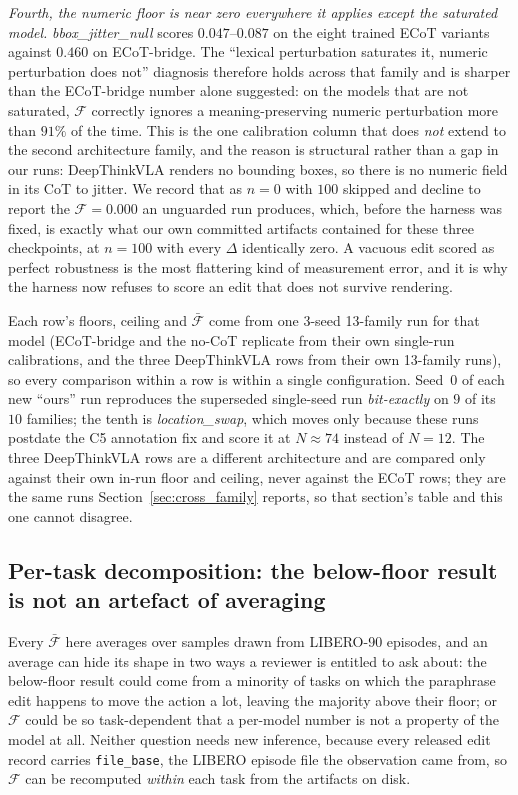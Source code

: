 \documentclass{article}
\begin{document}
\emph{Fourth, the numeric floor is near zero everywhere it applies except the saturated model.} \emph{bbox\_jitter\_null} scores $0.047$--$0.087$ on the eight trained ECoT variants against $0.460$ on ECoT-bridge. The ``lexical perturbation saturates it, numeric perturbation does not'' diagnosis therefore holds across that family and is sharper than the ECoT-bridge number alone suggested: on the models that are not saturated, $\mathcal{F}$ correctly ignores a meaning-preserving numeric perturbation more than $91\%$ of the time. This is the one calibration column that does \emph{not} extend to the second architecture family, and the reason is structural rather than a gap in our runs: DeepThinkVLA renders no bounding boxes, so there is no numeric field in its CoT to jitter. We record that as $n{=}0$ with $100$ skipped and decline to report the $\mathcal{F}=0.000$ an unguarded run produces, which, before the harness was fixed, is exactly what our own committed artifacts contained for these three checkpoints, at $n{=}100$ with every $\Delta$ identically zero. A vacuous edit scored as perfect robustness is the most flattering kind of measurement error, and it is why the harness now refuses to score an edit that does not survive rendering.

Each row's floors, ceiling and $\bar{\mathcal{F}}$ come from one 3-seed 13-family run for that model (ECoT-bridge and the no-CoT replicate from their own single-run calibrations, and the three DeepThinkVLA rows from their own 13-family runs), so every comparison within a row is within a single configuration. Seed~0 of each new ``ours'' run reproduces the superseded single-seed run \emph{bit-exactly} on $9$ of its $10$ families; the tenth is \emph{location\_swap}, which moves only because these runs postdate the C5 annotation fix and score it at $N\!\approx\!74$ instead of $N{=}12$. The three DeepThinkVLA rows are a different architecture and are compared only against their own in-run floor and ceiling, never against the ECoT rows; they are the same runs Section~\ref{sec:cross_family} reports, so that section's table and this one cannot disagree.

\subsection{Per-task decomposition: the below-floor result is not an artefact of averaging}
\label{sec:per_task}

Every $\bar{\mathcal{F}}$ here averages over samples drawn from LIBERO-90 episodes, and an average can hide its shape in two ways a reviewer is entitled to ask about: the below-floor result could come from a minority of tasks on which the paraphrase edit happens to move the action a lot, leaving the majority above their floor; or $\mathcal{F}$ could be so task-dependent that a per-model number is not a property of the model at all. Neither question needs new inference, because every released edit record carries \texttt{file\_base}, the LIBERO episode file the observation came from, so $\mathcal{F}$ can be recomputed \emph{within} each task from the artifacts on disk.
\end{document}
